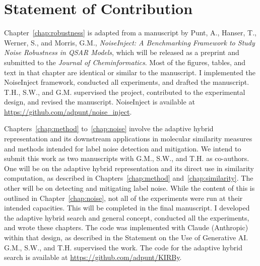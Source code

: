 \documentclass[a4paper,12pt]{report}
\begin{document}
\chapter*{Statement of Contribution}

\noindent
Chapter~\ref{chap:robustness} is adapted from a manuscript by Punt, A., Hanser, T.,
Werner, S., and Morris, G.M., \textit{NoiseInject: A Benchmarking Framework to Study Noise Robustness
in QSAR Models}, which will be released as a preprint and submitted to the \textit{Journal of
Cheminformatics}. Most of the figures, tables, and text in that chapter are identical or similar to
the manuscript. I implemented the NoiseInject framework, conducted all experiments, and drafted the
manuscript. T.H., S.W., and G.M. supervised the project, contributed to the experimental design, and
revised the manuscript. NoiseInject is available at \url{https://github.com/adpunt/noise_inject}.

\vspace{0.5cm}
\noindent
Chapters~\ref{chap:method} to~\ref{chap:noise} involve the adaptive hybrid representation and its downstream applications in molecular similarity measures and methods intended for label noise detection and mitigation. We intend to submit this work as two manuscripts with G.M., S.W., and T.H. as co-authors. One will be on the adaptive hybrid representation and its direct use in similarity computation, as described in Chapters~\ref{chap:method} and~\ref{chap:similarity}. The other will be on
detecting and mitigating label noise. While the content of this is outlined in Chapter~\ref{chap:noise}, not all of the experiments were run at their intended capacities. This will be completed in the final manuscript. I developed the adaptive hybrid search and general concept,
conducted all the experiments, and wrote these chapters. The code was implemented with Claude (Anthropic)
within that design, as described in the Statement on the Use of Generative AI. G.M., S.W., and T.H.
supervised the work. The code for the
adaptive hybrid search is available at \url{https://github.com/adpunt/KIRBy}.
\end{document}
